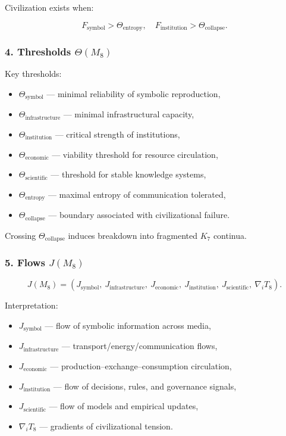 Civilization exists when:

\[
F_{\mathrm{symbol}} > \Theta_{\mathrm{entropy}},
\quad
F_{\mathrm{institution}} > \Theta_{\mathrm{collapse}}.
\]

\subsubsection*{4. Thresholds \texorpdfstring{$\Theta(M_8)$}{\Theta(M_8)}}

Key thresholds:

\begin{itemize}
    \item $\Theta_{\mathrm{symbol}}$ — minimal reliability of symbolic reproduction,
    \item $\Theta_{\mathrm{infrastructure}}$ — minimal infrastructural capacity,
    \item $\Theta_{\mathrm{institution}}$ — critical strength of institutions,
    \item $\Theta_{\mathrm{economic}}$ — viability threshold for resource circulation,
    \item $\Theta_{\mathrm{scientific}}$ — threshold for stable knowledge systems,
    \item $\Theta_{\mathrm{entropy}}$ — maximal entropy of communication tolerated,
    \item $\Theta_{\mathrm{collapse}}$ — boundary associated with civilizational failure.
\end{itemize}

Crossing $\Theta_{\mathrm{collapse}}$ induces breakdown into fragmented $K_7$ continua.

\subsubsection*{5. Flows \texorpdfstring{$J(M_8)$}{J(M_8)}}

\[
J(M_8)=
(J_{\mathrm{symbol}},\
J_{\mathrm{infrastructure}},\
J_{\mathrm{economic}},\
J_{\mathrm{institution}},\
J_{\mathrm{scientific}},\
\nabla_i T_8).
\]

Interpretation:

\begin{itemize}
    \item $J_{\mathrm{symbol}}$ — flow of symbolic information across media,
    \item $J_{\mathrm{infrastructure}}$ — transport/energy/communication flows,
    \item $J_{\mathrm{economic}}$ — production–exchange–consumption circulation,
    \item $J_{\mathrm{institution}}$ — flow of decisions, rules, and governance signals,
    \item $J_{\mathrm{scientific}}$ — flow of models and empirical updates,
    \item $\nabla_i T_8$ — gradients of civilizational tension.
\end{itemize}

